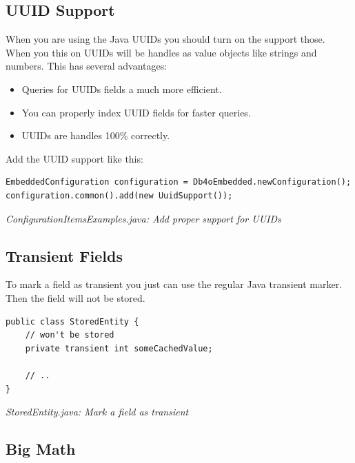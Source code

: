 \subsection{UUID Support}
\label{ref:advanced-topics-type-handling-uuid-support}

When you are using the Java UUIDs you should turn on the support those. When you this on UUIDs will be handles as value objects like strings and numbers. This has several advantages:

\begin{itemize}
\item Queries for UUIDs fields a much more efficient.
\item You can properly index UUID fields for faster queries.
\item UUIDs are handles 100\% correctly.
\end{itemize}

Add the UUID support like this:

\begin{lstlisting}
EmbeddedConfiguration configuration = Db4oEmbedded.newConfiguration();
configuration.common().add(new UuidSupport());
\end{lstlisting}

{\small\itshape ConfigurationItemsExamples.java: Add proper support for UUIDs\par}
\medskip

\subsection{Transient Fields}
\label{ref:advanced-topics-type-handling-transient-fields}

To mark a field as transient you just can use the regular Java transient marker. Then the field will not be stored.

\begin{lstlisting}
public class StoredEntity {
    // won't be stored
    private transient int someCachedValue;

    // ..
}
\end{lstlisting}

{\small\itshape StoredEntity.java: Mark a field as transient\par}
\medskip

\subsection{Big Math}
\label{ref:advanced-topics-type-handling-bigmath}

